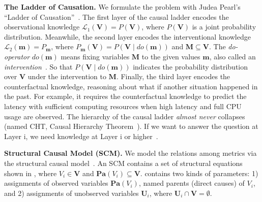 \noindent \textbf{The Ladder of Causation.}
We formulate the problem with Judea Pearl's ``Ladder of Causation''~\cite{Bareinboim:2022}.
The first layer of the causal ladder encodes the observational knowledge $\mathcal{L}_{1}(\mathbf{V}) = P(\mathbf{V})$, where $P(\mathbf{V})$ is a joint probability distribution.
Meanwhile, the second layer encodes the interventional knowledge $\mathcal{L}_{2}(\mathbf{m}) = P_{\mathbf{m}}$, where $P_{\mathbf{m}}(\mathbf{V}) = P(\mathbf{V} \mid do(\mathbf{m}))$ and $\mathbf{M} \subseteq\mathbf{V}$.
The \textit{do-operator} $do(\mathbf{m})$ means fixing variables $\mathbf{M}$ to the given values $\mathbf{m}$, also called an \textit{intervention}~\cite{Pearl:2009}.
So that $P(\mathbf{V} \mid do(\mathbf{m}))$ indicates the probability distribution over $\mathbf{V}$ under the intervention to $\mathbf{M}$.
Finally, the third layer encodes the counterfactual knowledge, reasoning about what if another situation happened in the past.
For example, it requires the counterfactual knowledge to predict the latency with sufficient computing resources when high latency and full CPU usage are observed.
The hierarchy of the causal ladder \textit{almost never} collapses (named CHT, Causal Hierarchy Theorem~\cite{Bareinboim:2022}).
If we want to answer the question at Layer i, we need knowledge at Layer i or higher~\cite{Bareinboim:2022}.

\noindent \textbf{Structural Causal Model (SCM).}
We model the relations among metrics via the structural causal model~\cite{Pearl:2009}.
An SCM contains a set of structural equations shown in , where $V_{i} \in \mathbf{V}$ and $\mathbf{Pa}(V_{i}) \subseteq \mathbf{V}$.
 contains two kinds of parameters:
1) assignments of observed variables $\mathbf{Pa}(V_{i})$, named parents (direct causes) of $V_{i}$, and
2) assignments of unobserved variables $\mathbf{U}_i$, where $\mathbf{U}_{i} \cap \mathbf{V} = \emptyset$.


